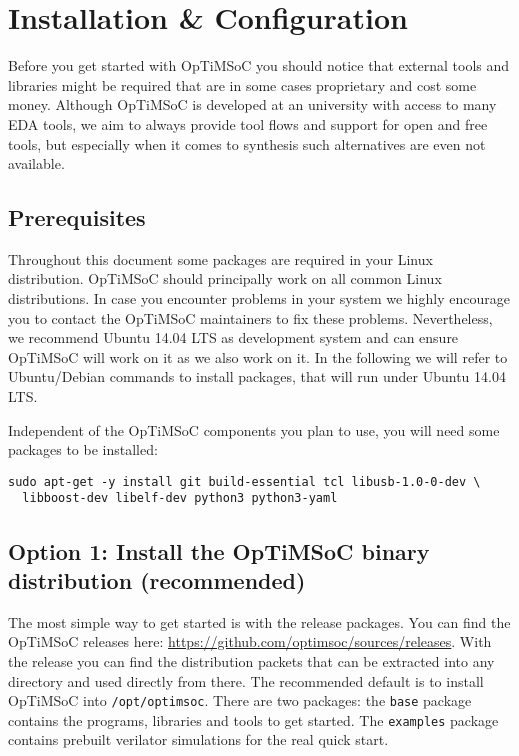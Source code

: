 \chapter{Installation \& Configuration}
\label{chap:installation}

Before you get started with OpTiMSoC you should notice that external
tools and libraries might be required that are in some cases
proprietary and cost some money. Although OpTiMSoC is developed at an
university with access to many EDA tools, we aim to always provide
tool flows and support for open and free tools, but especially when it
comes to synthesis such alternatives are even not available.

\section{Prerequisites}

Throughout this document some packages are required in your Linux
distribution. OpTiMSoC should principally work on all common Linux
distributions. In case you encounter problems in your system we highly
encourage you to contact the OpTiMSoC maintainers to fix these
problems. Nevertheless, we recommend Ubuntu 14.04 LTS as development
system and can ensure OpTiMSoC will work on it as we also work on
it. In the following we will refer to Ubuntu/Debian commands to
install packages, that will run under Ubuntu 14.04 LTS.

Independent of the OpTiMSoC components you plan to use, you will need some
packages to be installed:

\begin{lstlisting}
sudo apt-get -y install git build-essential tcl libusb-1.0-0-dev \
  libboost-dev libelf-dev python3 python3-yaml
\end{lstlisting}

\section{Option 1: Install the OpTiMSoC binary distribution (recommended)}

The most simple way to get started is with the release packages. You
can find the OpTiMSoC releases here:
\url{https://github.com/optimsoc/sources/releases}. With the release
you can find the distribution packets that can be extracted into any
directory and used directly from there. The recommended default is to
install OpTiMSoC into \verb|/opt/optimsoc|. There are two packages:
the \verb|base| package contains the programs, libraries and tools
to get started. The \verb|examples| package contains prebuilt verilator
simulations for the real quick start.

